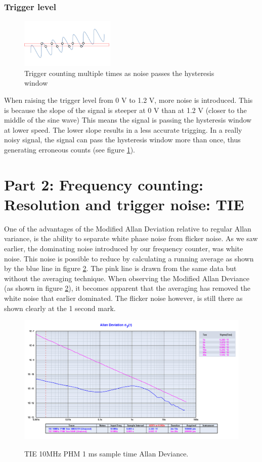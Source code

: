 \documentclass[11pt,english,a4paper]{article}
\begin{document}
\subsubsection{Trigger level}
\begin{figure}
  \centering
  \includegraphics[width=0.40\textwidth]{hysteresis.pdf}
  \caption{Trigger counting multiple times as noise passes the hysteresis window}
    \label{fig:hysteresis}
\end{figure}
When raising the trigger level from 0 V to 1.2 V, more noise is introduced. This is because the slope of the signal is steeper at 0 V than at 1.2 V (closer to the middle of the sine wave) This means the signal is passing the hysteresis window at lower speed. The lower slope results in a less accurate trigging. In a really noisy signal, the signal can pass the hysteresis window more than once, thus generating erroneous counts (see figure \ref{fig:hysteresis}). 

\section{Part 2: Frequency counting: Resolution and trigger noise: TIE}
One of the advantages of the Modified Allan Deviation relative to regular Allan variance, is the ability to separate white phase noise from flicker noise. As we saw earlier, the dominating noise introduced by our frequency counter, was white noise. This noise is possible to reduce by calculating a running average as shown by the blue line in figure \ref{fig:PHM_10MHz_allan_dev}. The pink line is drawn from the same data but without the averaging technique. When observing the Modified Allan Deviance (as shown in figure \ref{fig:PHM_10MHz_allan_dev}), it becomes apparent that the averaging has removed the white noise that earlier dominated. The flicker noise however, is still there as shown clearly at the 1 second mark. 

\begin{figure}[!htb]
  \caption{TIE 10MHz PHM 1 ms sample time Allan Deviance.}
  \centering
    \includegraphics[width=1\textwidth]{tie_10mhz_phm_1ms_allan.png}
    \label{fig:PHM_10MHz_allan_dev}
\end{figure}
\end{document}
